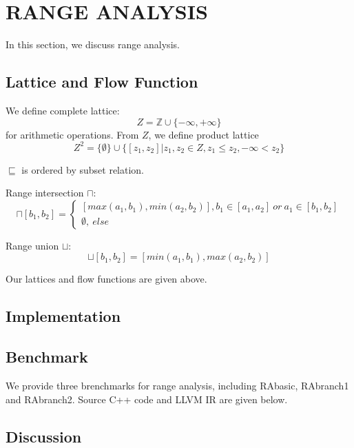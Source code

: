 \section{RANGE ANALYSIS}
In this section, we discuss range analysis.


\subsection{Lattice and Flow Function}
We define complete lattice:
\begin{equation}
Z = \mathbb{Z} \cup \{-\infty, +\infty\}
\end{equation}
for arithmetic operations. 
From $Z$, we define product lattice
\begin{equation}
Z^2 = \{\emptyset \} \cup \{[z_1, z_2] | z_1, z_2 \in Z, z_1 \le z_2, -\infty < z_2 \}
\end{equation}

$\sqsubseteq$ is ordered by subset relation. 

Range intersection $\sqcap$:
\begin{equation}
[a_1, a_2] \sqcap [b_1, b_2] =
\begin{cases}
[max(a_1, b_1), min(a_2, b_2)], b_1 \in [a_1, a_2] \ or \  a_1 \in [b_1, b_2] \\
\emptyset , \ else
\end{cases}
\end{equation}

Range union $\sqcup$:
\begin{equation}
[a_1, a_2] \sqcup [b_1, b_2] = [min(a_1, b_1), max(a_2, b_2)]
\end{equation}


Our lattices and flow functions are given above.

\subsection{Implementation}

\subsection{Benchmark}
We provide three brenchmarks for range analysis, including RAbasic, RAbranch1 and RAbranch2. Source C++ code and LLVM IR are given below. 


\subsection{Discussion}
